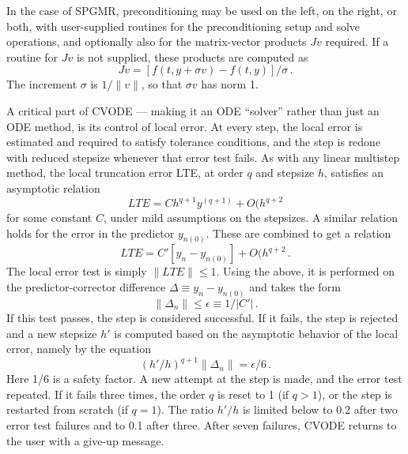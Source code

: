 In the case of SPGMR, preconditioning may be used on the left, on the
right, or both, with user-supplied routines for the preconditioning
setup and solve operations, and optionally also for the matrix-vector
products $Jv$ required.  If a routine for $Jv$ is not supplied, these
products are computed as
\begin{equation}\label{jacobv}
Jv = [f(t,y+\sigma v) - f(t,y)]/\sigma \, . 
\end{equation}
The increment $\sigma$ is $1/\|v\|$, so that $\sigma v$ has norm 1.

A critical part of CVODE --- making it an ODE ``solver'' rather than
just an ODE method, is its control of local error.  At every step, the
local error is estimated and required to satisfy tolerance conditions,
and the step is redone with reduced stepsize whenever that error test
fails.  As with any linear multistep method, the local truncation
error LTE, at order $q$ and stepsize $h$, satisfies an asymptotic
relation
\[ LTE = C h^{q+1} y^{(q+1)} + O(h^{q+2} \]
for some constant $C$, under mild assumptions on the stepsizes.
A similar relation holds for the error in the predictor $y_{n(0)}$.
These are combined to get a relation
\[ LTE = C' [y_n - y_{n(0)}] + O(h^{q+2} \, . \]
The local error test is simply $\|LTE\| \leq 1$.  Using the above,
it is performed on the predictor-corrector difference 
$\Delta \equiv y_n - y_{n(0)}$ and takes the form
\[ \|\Delta_n\| \leq \epsilon \equiv 1/|C'| \, . \]
If this test passes, the step is considered successful.  If it fails,
the step is rejected and a new stepsize $h'$ is computed based on the
asymptotic behavior of the local error, namely by the equation
\[ (h'/h)^{q+1} \|\Delta_n\| = \epsilon/6 \, . \]
Here 1/6 is a safety factor.  A new attempt at the step is made,
and the error test repeated.  If it fails three times, the order $q$
is reset to 1 (if $q > 1$), or the step is restarted from scratch (if
$q = 1$).  The ratio $h'/h$ is limited below to 0.2 after two error test
failures and to 0.1 after three.  After seven failures, CVODE returns
to the user with a give-up message.

